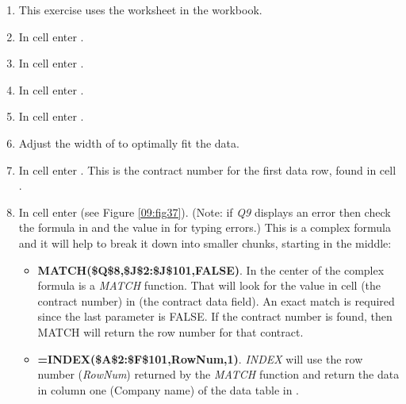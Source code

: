 \begin{enumbox}
	\begin{enumerate}
		\item This exercise uses the  worksheet in the  workbook.
		\item In cell  enter .
		\item In cell  enter .
		\item In cell  enter .
		\item In cell  enter .
		\item Adjust the width of  to optimally fit the data.
		\item In cell  enter . This is the contract number for the first data row, found in cell .
		\item In cell  enter  (see Figure \ref{09:fig37}). (Note: if \textit{Q9} displays an error then check the formula in  and the value in  for typing errors.) This is a complex formula and it will help to break it down into smaller chunks, starting in the middle: 
		
		\begin{itemize}
			\item \textbf{MATCH(\$Q\$8,\$J\$2:\$J\$101,FALSE)}. In the center of the complex formula is a \textit{MATCH} function. That will look for the value in cell  (the contract number) in  (the contract data field). An exact match is required since the last parameter is FALSE. If the contract number is found, then MATCH will return the row number for that contract.
			\item \textbf{=INDEX(\$A\$2:\$F\$101,RowNum,1)}. \textit{INDEX} will use the row number (\textit{RowNum}) returned by the \textit{MATCH} function and return the data in column one (Company name) of the data table in .
		\end{itemize}
			

\end{enumerate}
\end{enumbox}
